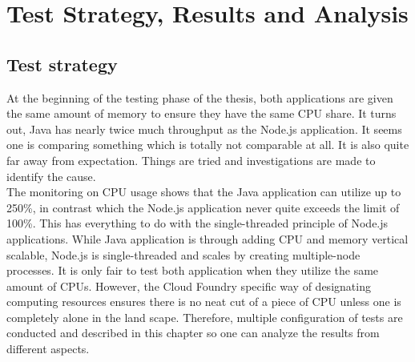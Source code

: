 \chapter{Test Strategy, Results and Analysis}
\section{Test strategy}
At the beginning of the testing phase of the thesis, both applications are given the same amount of memory to ensure they have the same CPU share. It turns out, Java has nearly twice much throughput as the Node.js application. It seems one is comparing something which is totally not comparable at all. It is also quite far away from expectation. Things are tried and investigations are made to identify the cause. \\
The monitoring on CPU usage shows that the Java application can utilize up to 250\%,  in contrast which the Node.js application never quite exceeds the limit of 100\%. This has everything to do with the single-threaded principle of Node.js applications. While Java application is through adding CPU and memory vertical scalable, Node.js is single-threaded and scales by creating multiple-node processes. It is only fair to test both application when they utilize the same amount of CPUs. However, the Cloud Foundry specific way of designating computing resources ensures there is no neat cut of a piece of CPU unless one is completely alone in the land scape. Therefore, multiple configuration of tests are conducted and described in this chapter so one can analyze the results from different aspects.  \\

